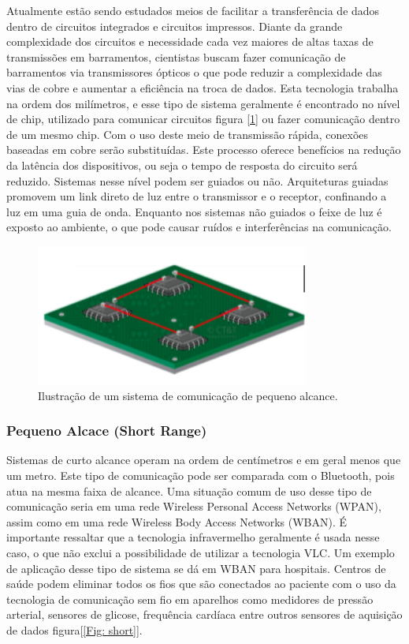 Atualmente estão sendo estudados meios de facilitar a transferência de dados dentro de circuitos integrados e circuitos impressos. Diante da grande complexidade dos circuitos e necessidade cada vez maiores de altas taxas de transmissões em barramentos, cientistas buscam fazer comunicação de barramentos via transmissores ópticos o que pode reduzir a complexidade das vias de cobre e aumentar a eficiência na troca de dados.
Esta tecnologia trabalha na ordem dos milímetros, e esse tipo de sistema geralmente é encontrado no nível de chip, utilizado para comunicar circuitos figura [\ref{Fig: ultra-short}] ou fazer comunicação dentro de um mesmo chip. Com o uso deste meio de transmissão rápida, conexões baseadas em cobre serão substituídas. Este processo oferece benefícios na redução da latência dos dispositivos, ou seja o tempo de resposta do circuito será reduzido. Sistemas nesse nível podem ser guiados ou não. Arquiteturas  guiadas promovem um link direto de luz entre o transmissor e o receptor, confinando a luz em uma guia de onda. Enquanto nos sistemas não guiados o feixe de luz é exposto ao ambiente, o que pode causar ruídos e interferências na comunicação.\cite{c.kachrisk.bergmankereni.tomkos2013}

\begin{figure}
	\centering
		\includegraphics[width = 9cm]{figuras/ultra-short}
	\caption{Ilustração de um sistema de comunicação de pequeno alcance.}
	\label{Fig: ultra-short}
\end{figure}

\subsubsection{Pequeno Alcace (Short Range)}

Sistemas de curto alcance operam na ordem de centímetros e em geral menos que um metro. Este tipo de comunicação pode ser comparada com o Bluetooth, pois atua na mesma faixa de alcance. Uma situação comum de uso desse tipo de comunicação seria em uma rede Wireless Personal Access Networks (WPAN), assim como em uma rede Wireless Body Access Networks (WBAN). É importante ressaltar que a tecnologia infravermelho geralmente é usada nesse caso, o que não exclui a possibilidade de utilizar a tecnologia VLC. Um exemplo de aplicação desse tipo de sistema se dá em WBAN para hospitais. Centros de saúde  podem eliminar todos os fios que são conectados ao paciente com o uso da tecnologia de comunicação sem fio em aparelhos como medidores de pressão arterial, sensores de glicose, frequência cardíaca entre outros sensores de aquisição de dados figura[\ref{Fig: short}].

